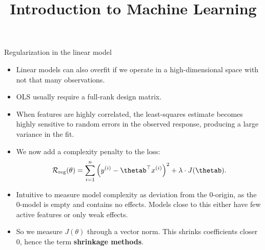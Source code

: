 



\newcommand{\titlefigure}{figure_man/ridge_hat.png}
\newcommand{\learninggoals}{
  \item Know the regularized linear model
  \item Know Ridge regression (L2 penality)
  \item Know Lasso regression (L1 penality)
}

\title{Introduction to Machine Learning}
\date{}





\begin{vbframe}{Regularization in the linear model}

  \begin{itemize}
  \item Linear models can also overfit if we operate in a high-dimensional space with not that many observations.    
  \item OLS usually require a full-rank design matrix.
  \item When features are highly correlated, the least-squares estimate becomes highly sensitive to random errors in the observed response, producing a large variance in the fit. 
  \item We now add a complexity penalty to the loss:
  $$
  \riskrt = \sumin \left(\yi - \thetab^\top \xi \right)^2 + \lambda \cdot J(\thetab). 
  $$ 
  \item Intuitive to measure model complexity as deviation from the 0-origin, as the 0-model is empty and contains no effects. Models close to this either have few active features or only weak effects. 
  \item So we measure $J(\theta)$ through a vector norm.
    This shrinks coefficients closer 0, hence the term \textbf{shrinkage methods}.
  \end{itemize}

\end{vbframe}



